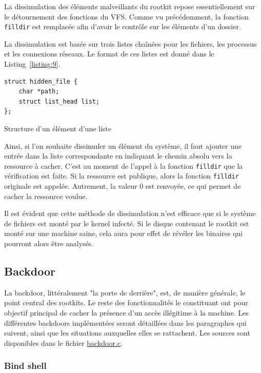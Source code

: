 \documentclass[12pt]{article}
\begin{document}
        	La dissimulation des éléments malveillants du rootkit repose essentiellement sur le détournement des fonctions du VFS. Comme vu précédemment, la fonction \texttt{filldir} est remplacée afin d'avoir le contrôle sur les éléments d'un dossier. 

			La dissimulation est basée sur trois listes chaînées pour les fichiers, les processus et les connexions réseaux. Le format de ces listes est donné dans le Listing~\ref{listing:9}.

\begin{listing}[H]
\begin{verbatim}
struct hidden_file {
    char *path;
    struct list_head list;
};
\end{verbatim}
\caption{Structure d'un élément d'une liste}
\label{listing:9}
\end{listing}

			Ainsi, si l'on souhaite dissimuler un élément du système, il faut ajouter une entrée dans la liste correspondante en indiquant le chemin absolu vers la ressource à cacher. C'est au moment de l'appel à la fonction \texttt{filldir} que la vérification est faite. Si la ressource est publique, alors la fonction \texttt{filldir} originale  est appelée. Autrement, la valeur 0 est renvoyée, ce qui permet de cacher la ressource voulue.

			Il est évident que cette méthode de dissimulation n'est efficace que si le système de fichiers est monté par le kernel infecté. Si le disque contenant le rootkit est monté sur une machine saine, cela aura pour effet de révéler les binaires qui pourront alors être analysés.

    \subsection{Backdoor}

        La backdoor, littéralement "la porte de derrière", est, de manière générale, le point central des rootkits. Le reste des fonctionnalités le constituant ont pour objectif principal de cacher la présence d'un accès illégitime à la machine. Les différentes backdoors implémentées seront détaillées dans les paragraphes qui suivent, ainsi que les situations auxquelles elles se rattachent. Les sources sont disponibles dans le fichier \href{https://github.com/QuokkaLight/rkduck/blob/master/rkduck/backdoor.c}{backdoor.c}.
    
        \subsubsection{Bind shell}
            
\end{document}
